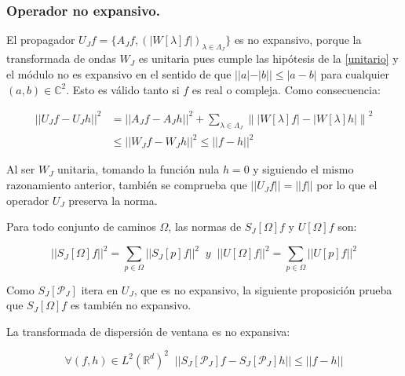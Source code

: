 \subsubsection{Operador no expansivo.}

\noindent El propagador $U_Jf=\lbrace A_Jf, \left(\left| W[\lambda]f\right|\right)_{\lambda\in\Lambda_J} \rbrace$ es no expansivo, porque la transformada de ondas $W_J$ es unitaria pues cumple las hipótesis de la \autoref{unitario} y el módulo no es expansivo en el sentido de que $||a|-|b||\leq |a-b|$ para cualquier $(a,b)\in \mathbb{C}^2$. Esto es válido tanto si $f$ es real o compleja. Como consecuencia: 

\begin{align*} 
    ||U_J f-U_J h||^2 &= ||A_J f-A_J h||^2+\sum_{\lambda\in\Lambda_J} \left\| |W[\lambda]f|-|W[\lambda]h| \right\|^2 \\
    &\leq \left| \left| W_J f- W_J h \right| \right|^2 \leq ||f-h||^2
\end{align*}

\noindent Al ser $W_J$ unitaria, tomando la función nula $h=0$ y siguiendo el mismo razonamiento anterior, también se comprueba que $||U_J f||=||f||$ por lo que el operador $U_J$ preserva la norma.

\medskip

\noindent Para todo conjunto de caminos $\Omega$, las normas de $S_J[\Omega]f$ y $U[\Omega]f$ son: 

$$\left|\left| S_J[\Omega]f \right|\right|^2=\sum_{p\in\Omega} \left|\left| S_J[p]f\right|\right|^2 \;\; y \;\; \left|\left|U[\Omega]f\right|\right|^2=\sum_{p\in\Omega} \left|\left| U[p]f\right|\right|^2$$

\noindent Como $S_J[\mathcal{P}_J]$ itera en $U_J$, que es no expansivo, la siguiente proposición prueba que $S_J[\Omega]f$ es también no expansivo. 

\begin{proposicion} \label{proposicion::NoExpansiva}
La transformada de dispersión de ventana es no expansiva: 

\begin{equation}
  \forall (f,h)\in L^2(\mathbb{R}^d)^2 \;\; ||S_J[\mathcal{P}_J]f-S_J[\mathcal{P}_J]h|| \leq ||f-h||
\end{equation}
\end{proposicion}

